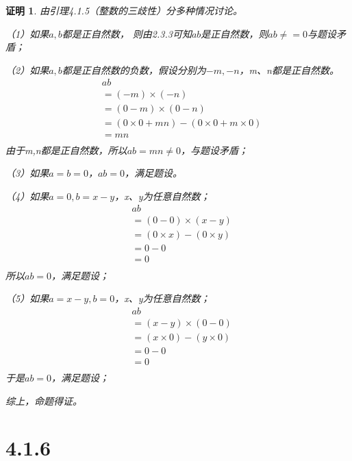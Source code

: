 \documentclass{article}
\theoremstyle{mystyle}
\theoremstyle{zproofstyle}
\newtheorem*{zproof}{证明}
\begin{document}
\begin{zproof}
  由引理4.1.5（整数的三歧性）分多种情况讨论。

  （1）如果$a,b$都是正自然数，
  则由2.3.3可知$ab$是正自然数，则$ab \neq = 0$与题设矛盾；

  （2）如果$a,b$都是正自然数的负数，假设分别为$-m,-n$，m、n都是正自然数。
  \begin{align*}
     & ab                                              \\
     & = (-m) \times (-n)                              \\
     & = (0-m) \times (0-n)                            \\
     & = (0 \times 0 + mn) - (0 \times 0 + m \times 0) \\
     & = mn                                            \\
  \end{align*}
  由于m,n都是正自然数，所以$ab=mn \neq 0$，与题设矛盾；

  （3）如果$a=b=0$，$ab=0$，满足题设。

  （4）如果$a=0,b=x-y$，x、y为任意自然数；
  \begin{align*}
     & ab                            \\
     & = (0-0) \times (x-y)          \\
     & = (0 \times x) - (0 \times y) \\
     & = 0 - 0                       \\
     & = 0                           \\
  \end{align*}
  所以$ab=0$，满足题设；

  （5）如果$a=x-y,b=0$，x、y为任意自然数；
  \begin{align*}
     & ab                            \\
     & = (x-y) \times (0-0)          \\
     & = (x \times 0) - (y \times 0) \\
     & = 0 - 0                       \\
     & = 0                           \\
  \end{align*}
  于是$ab=0$，满足题设；

  综上，命题得证。
\end{zproof}

\section*{4.1.6}
\end{document}
